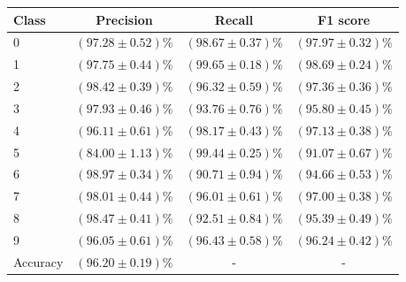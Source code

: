 \begin{tabular}{l|c|c|c}
\hline
Class &  Precision & Recall & F1 score \\
\hline
0 & $(97.28 \pm 0.52)\%$ & $(98.67 \pm 0.37)\%$ & $(97.97 \pm 0.32)\%$ \\
1 & $(97.75 \pm 0.44)\%$ & $(99.65 \pm 0.18)\%$ & $(98.69 \pm 0.24)\%$ \\
2 & $(98.42 \pm 0.39)\%$ & $(96.32 \pm 0.59)\%$ & $(97.36 \pm 0.36)\%$ \\
3 & $(97.93 \pm 0.46)\%$ & $(93.76 \pm 0.76)\%$ & $(95.80 \pm 0.45)\%$ \\
4 & $(96.11 \pm 0.61)\%$ & $(98.17 \pm 0.43)\%$ & $(97.13 \pm 0.38)\%$ \\
5 & $(84.00 \pm 1.13)\%$ & $(99.44 \pm 0.25)\%$ & $(91.07 \pm 0.67)\%$ \\
6 & $(98.97 \pm 0.34)\%$ & $(90.71 \pm 0.94)\%$ & $(94.66 \pm 0.53)\%$ \\
7 & $(98.01 \pm 0.44)\%$ & $(96.01 \pm 0.61)\%$ & $(97.00 \pm 0.38)\%$ \\
8 & $(98.47 \pm 0.41)\%$ & $(92.51 \pm 0.84)\%$ & $(95.39 \pm 0.49)\%$ \\
9 & $(96.05 \pm 0.61)\%$ & $(96.43 \pm 0.58)\%$ & $(96.24 \pm 0.42)\%$ \\
\hline
Accuracy & $(96.20 \pm 0.19)\%$ & - & - \\
\hline
\end{tabular}
